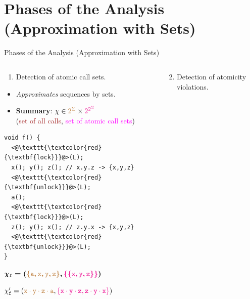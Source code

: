 \documentclass[10pt, xcolor=pdflatex, hyperref={unicode}, aspectratio=169]{beamer}
\begin{document}
\section{Phases of the Analysis (Approximation with Sets)}
\begin{frame}[fragile]{Phases of the Analysis (Approximation with Sets)}
    \begin{columns}
        \begin{column}[T]{.55 \linewidth}
            \begin{enumerate}
                \item Detection of \alert{atomic call sets}.
            \end{enumerate}

            \begin{itemize}
                \item \emph{Approximates} \alert{sequences by sets}.

                \item \textbf{Summary}: $ \chi \in \textcolor{brown}{2^\Sigma} \times \textcolor{magenta}{2^{2^\Sigma}} $ \\
                    (\textcolor{brown}{set of all calls}, \textcolor{magenta}{set of atomic call sets})
            \end{itemize}

\begin{lstlisting}
void f() {
  <@\texttt{\textcolor{red}{\textbf{lock}}}@>(L);
  x(); y(); z(); // x.y.z -> {x,y,z}
  <@\texttt{\textcolor{red}{\textbf{unlock}}}@>(L);
  a();
  <@\texttt{\textcolor{red}{\textbf{lock}}}@>(L);
  z(); y(); x(); // z.y.x -> {x,y,z}
  <@\texttt{\textcolor{red}{\textbf{unlock}}}@>(L);
}
\end{lstlisting}

            \centering
            \footnotesize

            $ \boldsymbol{\chi_\mathtt{f} = (\textcolor{brown}{\{\mathtt{a, x, y, z}\}}, \textcolor{magenta}{\{\{\mathtt{x, y, z}\}\}})} $

            \smallskip

            \textcolor{gray}{$ \chi_\mathtt{f}^\prime = (\textcolor{brown}{\mathtt{x \cdot y \cdot z \cdot a}}, \textcolor{magenta}{\{\mathtt{x \cdot y \cdot z}, \mathtt{z \cdot y \cdot x}\}}) $}
        \end{column}

        \begin{column}[T]{.45 \linewidth}
            \begin{enumerate}\setcounter{enumi}{1}
                \item Detection of \alert{atomicity violations}.
            \end{enumerate}


\end{column}
\end{columns}
\end{frame}
\end{document}
